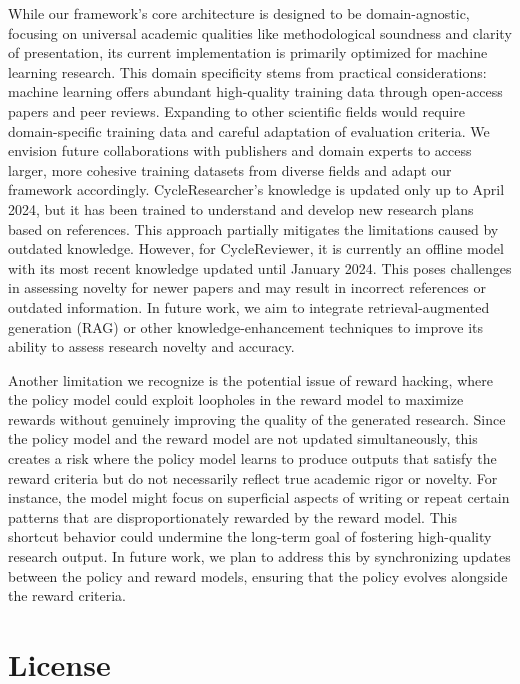 \documentclass{article} %
\begin{document}
While our framework's core architecture is designed to be domain-agnostic, focusing on universal academic qualities like methodological soundness and clarity of presentation, its current implementation is primarily optimized for machine learning research. This domain specificity stems from practical considerations: machine learning offers abundant high-quality training data through open-access papers and peer reviews. Expanding to other scientific fields would require domain-specific training data and careful adaptation of evaluation criteria. We envision future collaborations with publishers and domain experts to access larger, more cohesive training datasets from diverse fields and adapt our framework accordingly. CycleResearcher's knowledge is updated only up to April 2024, but it has been trained to understand and develop new research plans based on references. This approach partially mitigates the limitations caused by outdated knowledge. However, for CycleReviewer, it is currently an offline model with its most recent knowledge updated until January 2024. This poses challenges in assessing novelty for newer papers and may result in incorrect references or outdated information. In future work, we aim to integrate retrieval-augmented generation (RAG) \citep{NEURIPS2020_6b493230} or other knowledge-enhancement techniques to improve its ability to assess research novelty and accuracy.

Another limitation we recognize is the potential issue of reward hacking, where the policy model could exploit loopholes in the reward model to maximize rewards without genuinely improving the quality of the generated research. Since the policy model and the reward model are not updated simultaneously, this creates a risk where the policy model learns to produce outputs that satisfy the reward criteria but do not necessarily reflect true academic rigor or novelty. For instance, the model might focus on superficial aspects of writing or repeat certain patterns that are disproportionately rewarded by the reward model. This shortcut behavior could undermine the long-term goal of fostering high-quality research output. In future work, we plan to address this by synchronizing updates between the policy and reward models, ensuring that the policy evolves alongside the reward criteria.
\section{License}
\label{app:license}
\end{document}
